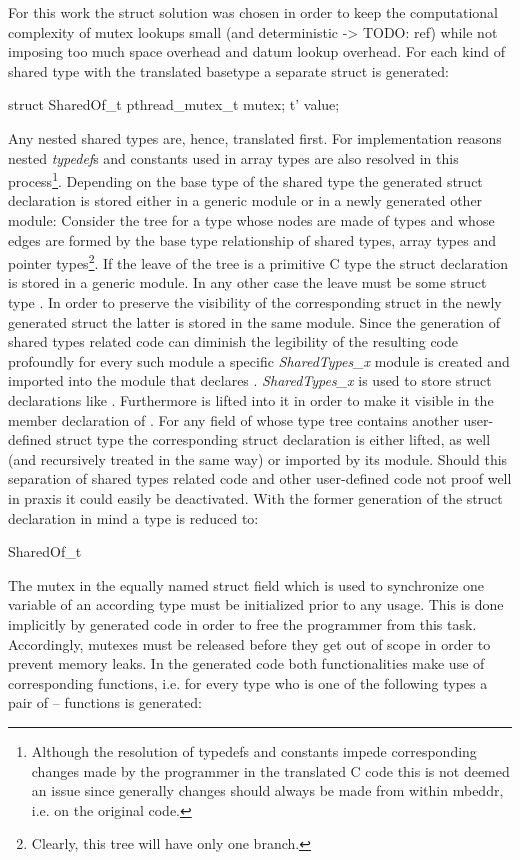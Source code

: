 For this work the struct solution was chosen in order to keep the computational complexity of mutex lookups small (and deterministic -> TODO: ref) while not imposing too much space overhead and datum lookup overhead. For each kind of shared type  with the translated basetype  a separate struct is generated:
\begin{ccode}
struct SharedOf_t {
  pthread_mutex_t mutex;
  t' value;
}
\end{ccode}
Any nested shared types are, hence, translated first. For implementation reasons nested \textit{typedef}s and constants used in array types are also resolved in this process\footnote{Although the resolution of typedefs and constants impede corresponding changes made by the programmer in the translated C code this is not deemed an issue since generally changes should always be made from within mbeddr, i.e. on the original code.}. Depending on the base type of the shared type the generated struct declaration is stored either in a generic module or in a newly generated other module: Consider the tree for a type  whose nodes are made of types and whose edges are formed by the base type relationship of shared types, array types and pointer types\footnote{Clearly, this tree will have only one branch.}. 
If the leave of the tree is a primitive C type the struct declaration is stored in a generic module. In any other case the leave must be some struct type . In order to preserve the visibility of the corresponding struct in the newly generated struct  the latter is stored in the same module. Since the generation of shared types related code can diminish the legibility of the resulting code profoundly for every such module a specific \textit{SharedTypes\_x} module is created and imported into the module that declares . \textit{SharedTypes\_x} is used to store struct declarations like . Furthermore  is lifted into it in order to make it visible in the member declaration  of . For any field of  whose type tree contains another user-defined struct type the corresponding struct declaration is either lifted, as well (and recursively treated in the same way) or imported by its module. Should this separation of shared types related code and other user-defined code not proof well in praxis it could easily be deactivated.
With the former generation of the struct declaration in mind a type  is reduced to:
\begin{ccode}
SharedOf_t
\end{ccode}
The mutex in the equally named struct field which is used to synchronize one variable of an according type  must be initialized prior to any usage. This is done implicitly by generated code in order to free the programmer from this task. Accordingly, mutexes must be released before they get out of scope in order to prevent memory leaks. In the generated code both functionalities make use of corresponding functions, i.e. for every type who is one of the following types a pair of -- functions is generated:

